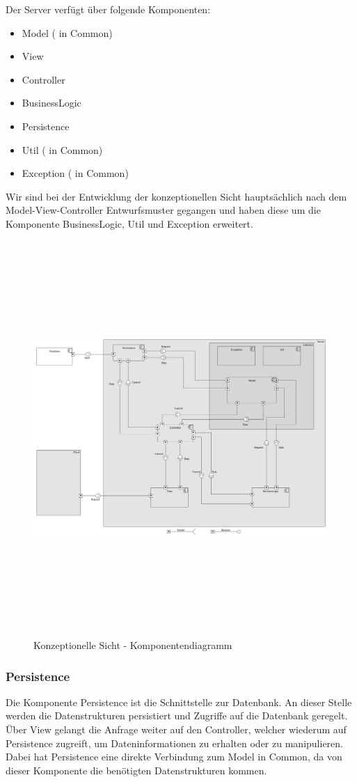 {Der Server verfügt über folgende Komponenten:
\begin{itemize}
	\item Model ( in Common)
	\item View
	\item Controller
	\item BusinessLogic
	\item Persistence
	\item Util ( in Common)
	\item Exception ( in Common)
\end{itemize}

{Wir sind bei der Entwicklung der konzeptionellen Sicht hauptsächlich nach dem Model-View-Controller Entwurfsmuster
gegangen und haben
diese um die Komponente BusinessLogic, Util und Exception erweitert.}

\begin{figure}[ht]
	\centering
  \includegraphics[width=\textwidth,height=15cm,keepaspectratio]{../UMLDiagramme/KonzeptionelleSicht}
	\caption{Konzeptionelle Sicht - Komponentendiagramm}
	\label{fig1}
\end{figure}

\subsubsection{Persistence}
{Die Komponente Persistence ist die Schnittstelle zur Datenbank. An dieser Stelle werden die Datenstrukturen persistiert und Zugriffe auf die Datenbank geregelt. Über View gelangt die Anfrage weiter auf den Controller, welcher 
wiederum auf Persistence zugreift, um Dateninformationen zu erhalten oder zu manipulieren. Dabei hat Persistence  eine direkte Verbindung zum Model in Common, da von dieser Komponente die benötigten Datenstrukturen kommen.}

}

